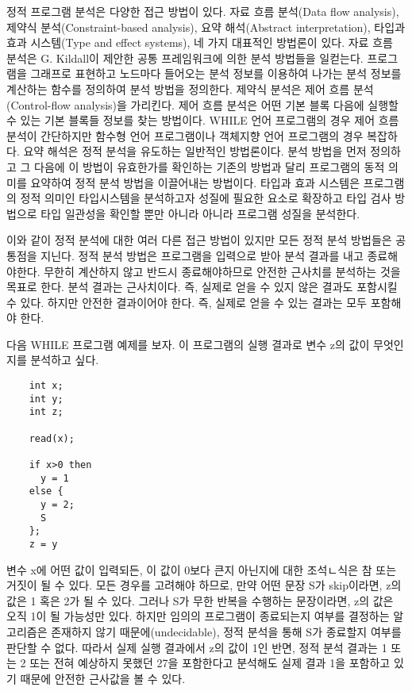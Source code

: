 \documentclass[a4paper]{book}
\begin{document}
정적 프로그램 분석은 다양한 접근 방법이 있다. 자료 흐름 분석(Data flow
analysis), 제약식 분석(Constraint-based analysis), 요약 해석(Abstract
interpretation), 타입과 효과 시스템(Type and effect systems), 네 가지
대표적인 방법론이 있다.
%
자료 흐름 분석은 G. Kildall이 제안한 공통
프레임워크\cite{kildall1973}에 의한 분석 방법들을 일컫는다. 프로그램을
그래프로 표현하고 노드마다 들어오는 분석 정보를 이용하여 나가는 분석
정보를 계산하는 함수를 정의하여 분석 방법을 정의한다.
%
제약식 분석은 제어 흐름 분석(Control-flow analysis)을 가리킨다. 제어
흐름 분석은 어떤 기본 블록 다음에 실행할 수 있는 기본 블록들 정보를
찾는 방법이다. WHILE 언어 프로그램의 경우 제어 흐름 분석이 간단하지만
함수형 언어 프로그램이나 객체지향 언어 프로그램의 경우 복잡하다.
%
요약 해석은 정적 분석을 유도하는 일반적인 방법론이다. 분석 방법을 먼저
정의하고 그 다음에 이 방법이 유효한가를 확인하는 기존의 방법과 달리
프로그램의 동적 의미를 요약하여 정적 분석 방법을 이끌어내는 방법이다.
%
타입과 효과 시스템은 프로그램의 정적 의미인 타입시스템을 분석하고자
성질에 필요한 요소로 확장하고 타입 검사 방법으로 타입 일관성을 확인할
뿐만 아니라 아니라 프로그램 성질을 분석한다.

이와 같이 정적 분석에 대한 여러 다른 접근 방법이 있지만 모든 정적 분석
방법들은 공통점을 지닌다. 정적 분석 방법은 프로그램을 입력으로 받아
분석 결과를 내고 종료해야한다. 무한히 계산하지 않고 반드시
종료해야하므로 안전한 근사치를 분석하는 것을 목표로 한다.  분석 결과는
근사치이다. 즉, 실제로 얻을 수 있지 않은 결과도 포함시킬 수
있다. 하지만 안전한 결과이어야 한다. 즉, 실제로 얻을 수 있는 결과는
모두 포함해야 한다.

다음 WHILE 프로그램 예제를 보자. 이 프로그램의 실행 결과로 변수 z의
값이 무엇인지를 분석하고 싶다. 

\begin{center}
\begin{minipage}[h]{.7\textwidth}
  \begin{lstlisting}
    int x;
    int y;
    int z;
    
    read(x);
    
    if x>0 then
      y = 1
    else {
      y = 2;
      S
    };
    z = y
  \end{lstlisting}
\end{minipage}
\end{center}

변수 x에 어떤 값이 입력되든, 이 값이 0보다 큰지 아닌지에 대한
조석ㄴ식은 참 또는 거짓이 될 수 있다.  모든 경우를 고려해야 하므로,
만약 어떤 문장 S가 skip이라면, z의 값은 1 혹은 2가 될 수 있다.
%
그러나 S가 무한 반복을 수행하는 문장이라면, z의 값은 오직 1이 될
가능성만 있다.
%
하지만 임의의 프로그램이 종료되는지 여부를 결정하는 알고리즘은 존재하지
않기 때문에(undecidable), 정적 분석을 통해 S가 종료할지 여부를 판단할 수 없다. 
%
따라서 실제 실행 결과에서 z의 값이 1인 반면, 정적 분석 결과는 1 또는 2
또는 전혀 예상하지 못했던 27을 포함한다고 분석해도 실제 결과 1을
포함하고 있기 때문에 안전한 근사값을 볼 수 있다.
\end{document}
